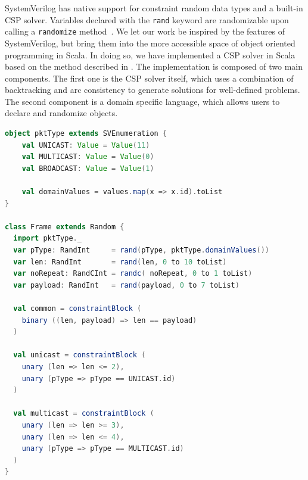 \documentclass[conference]{IEEEtran}
\newcommand{\code}[1]{{\small{\texttt{#1}}}}
\begin{document}

SystemVerilog has native support for constraint random data types and a built-in CSP solver. Variables declared with the \texttt{rand} keyword are randomizable upon calling a \texttt{randomize} method~\cite{spear2008systemverilog}. We let our work be inspired by the features of SystemVerilog, but bring them into the more accessible space of object oriented programming in Scala. In doing so, we have implemented a CSP solver in Scala based on the method described in \cite{russell2002artificial}. The implementation is composed of two main components. The first one is the CSP solver itself, which uses a combination of backtracking and arc consistency to generate solutions for well-defined problems. The second component is a domain specific language, which allows users to declare and randomize objects.

\begin{lstlisting}[language=scala, caption={Random object in Scala}, label={lst:randobjscala}]
object pktType extends SVEnumeration {
    val UNICAST: Value = Value(11)
    val MULTICAST: Value = Value(0)
    val BROADCAST: Value = Value(1)
    
    val domainValues = values.map(x => x.id).toList
}

class Frame extends Random {
  import pktType._
  var pType: RandInt     = rand(pType, pktType.domainValues())
  var len: RandInt       = rand(len, 0 to 10 toList)
  var noRepeat: RandCInt = randc( noRepeat, 0 to 1 toList)
  var payload: RandInt   = rand(payload, 0 to 7 toList)

  val common = constraintBlock (
    binary ((len, payload) => len == payload)
  )

  val unicast = constraintBlock (
    unary (len => len <= 2),
    unary (pType => pType == UNICAST.id)
  )

  val multicast = constraintBlock (
    unary (len => len >= 3),
    unary (len => len <= 4),
    unary (pType => pType == MULTICAST.id)
  )
}
\end{lstlisting}
\end{document}

